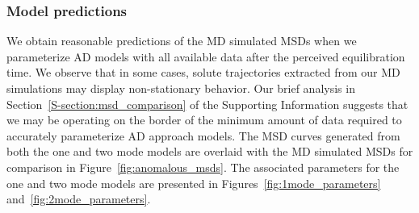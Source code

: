 \documentclass[journal=ancac3,manuscript=article,layout=twocolumn]{achemso}
\begin{document}
%
%  

  \subsubsection{Model predictions}\label{section:AD_all_data}
  
  We obtain reasonable predictions of the MD simulated MSDs when we
  parameterize AD models with all available data after the perceived
  equilibration time.   
  We observe that in some cases, solute trajectories extracted from our MD
  simulations may display non-stationary behavior. Our brief analysis 
  in Section~\ref{S-section:msd_comparison} of the Supporting Information 
  suggests that we may be operating on the border of the minimum amount of
  data required to accurately parameterize AD approach models.
  The MSD curves generated from both the one and two mode models are overlaid
  with the MD simulated MSDs for comparison in Figure~\ref{fig:anomalous_msds}.
  The associated parameters for the one and two mode models are presented in
  Figures~\ref{fig:1mode_parameters} and~\ref{fig:2mode_parameters}.
  
\end{document}

